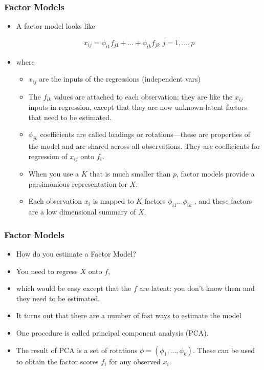 \documentclass[
  shownotes,
  xcolor={svgnames},
  hyperref={colorlinks,citecolor=DarkBlue,linkcolor=DarkRed,urlcolor=DarkBlue}
  , aspectratio=169]{beamer}
\begin{document}
\begin{frame}
\frametitle{Factor Models}

\begin{itemize}
\item A factor model looks like 

\begin{align}
x_{ij}=  \phi_{i1} f_{j1} + \dots + \phi_{ik} f_{jk} \,\, j=1,\dots,p
\end{align}

\item where 
  \begin{itemize}
   \item $x_{ij}$ are the inputs of the regressions (independent vars)
   \medskip
   \item The $f_{ik}$ values are attached to each observation; they are like the $x_{ij}$ inputs in regression, except that they are now unknown latent factors that need to be estimated.
  \medskip
   \item $\phi_{jk}$ coefficients are called loadings or rotations—these are properties of the model and are shared across all observations. They are coefficients for regression of $x_{ij}$ onto $f_i$.
  \medskip
   \item When you use a $K$ that is much smaller than $p$, factor models provide a parsimonious representation for $X$. 
   \medskip
   \item Each observation $x_i$ is mapped to $K$ factors $\phi_{i1} \dots \phi_{ik}$ , and these factors are a low dimensional summary of $X$.
  \end{itemize}


\end{itemize}
\end{frame}
\begin{frame}
\frametitle{Factor Models}

\begin{itemize}
\item How do you estimate a Factor Model?
\medskip
\item You need to regress $X$ onto $f$, 
\medskip
\item which would be easy except that the $f$ are latent: you don’t know them and they need to be estimated. 
\medskip
\item It turns out that there are a number of fast ways to estimate the model
\medskip
\item One procedure is called principal component analysis (PCA). 
\medskip
\item The result of PCA is a set of rotations $\phi=(\phi_1,\dots,\phi_k)$. These can be used to obtain the factor scores $f_i$ for any observed $x_i$.

\end{itemize}


\end{frame}
\end{document}
